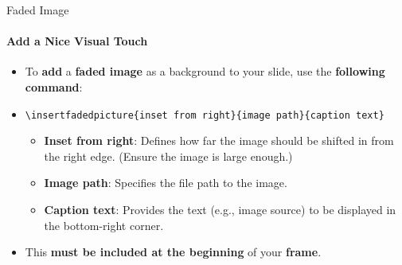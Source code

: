 \documentclass[aspectratio=169]{beamer}
\begin{document}
\begin{frame}{Faded Image}
    \framesubtitle{Add a Nice Visual Touch}


    \vspace{-0.3cm}
    \begin{minipage}[t]{0.75\textwidth}
        \begin{coloredblock}
            \begin{itemize}
               \item To \textbf{add} a \textbf{faded image} as a background to your slide, use the \textbf{following command}:
                \item[] \begin{center}\footnotesize\texttt{\textbackslash insertfadedpicture\{inset from right\}\{image path\}\{caption text\}}\end{center}
                \begin{itemize}
                    \item \textbf{Inset from right}: Defines how far the image should be shifted in from the right edge. (Ensure the image is large enough.)
                    \item \textbf{Image path}: Specifies the file path to the image.
                    \item \textbf{Caption text}: Provides the text (e.g., image source) to be displayed in the bottom-right corner.
                \end{itemize}
                \item This \textbf{must be included at the beginning} of your \textbf{frame}.
            \end{itemize}     
        \end{coloredblock}
    \end{minipage}
\end{frame}
\end{document}
